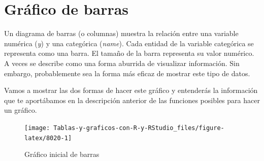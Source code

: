\documentclass[
]{book}
\newenvironment{Shaded}{\begin{snugshade}}{\end{snugshade}}
\newcommand{\AttributeTok}[1]{\textcolor[rgb]{0.77,0.63,0.00}{#1}}
\newcommand{\CommentTok}[1]{\textcolor[rgb]{0.56,0.35,0.01}{\textit{#1}}}
\newcommand{\ConstantTok}[1]{\textcolor[rgb]{0.00,0.00,0.00}{#1}}
\newcommand{\FunctionTok}[1]{\textcolor[rgb]{0.00,0.00,0.00}{#1}}
\newcommand{\NormalTok}[1]{#1}
\newcommand{\OtherTok}[1]{\textcolor[rgb]{0.56,0.35,0.01}{#1}}
\newcommand{\SpecialCharTok}[1]{\textcolor[rgb]{0.00,0.00,0.00}{#1}}
\newcommand{\StringTok}[1]{\textcolor[rgb]{0.31,0.60,0.02}{#1}}
\begin{document}
\hypertarget{gruxe1fico-de-barras}{%
\section{Gráfico de barras}\label{gruxe1fico-de-barras}}

Un diagrama de barras (o columnas) muestra la relación entre una variable numérica (\emph{y}) y una categórica (\emph{name}). Cada entidad de la variable categórica se representa como una barra. El tamaño de la barra representa su valor numérico. A veces se describe como una forma aburrida de visualizar información. Sin embargo, probablemente sea la forma más eficaz de mostrar este tipo de datos.

Vamos a mostrar las dos formas de hacer este gráfico y entenderás la información que te aportábamos en la descripción anterior de las funciones posibles para hacer un gráfico.

\begin{Shaded}
\end{Shaded}

\begin{figure}[H]

{\centering \texttt{[image: Tablas-y-graficos-con-R-y-RStudio\_files/figure-latex/8020-1]} 

}

\caption{Gráfico inicial de barras}\label{fig:8020}
\end{figure}
\end{document}
